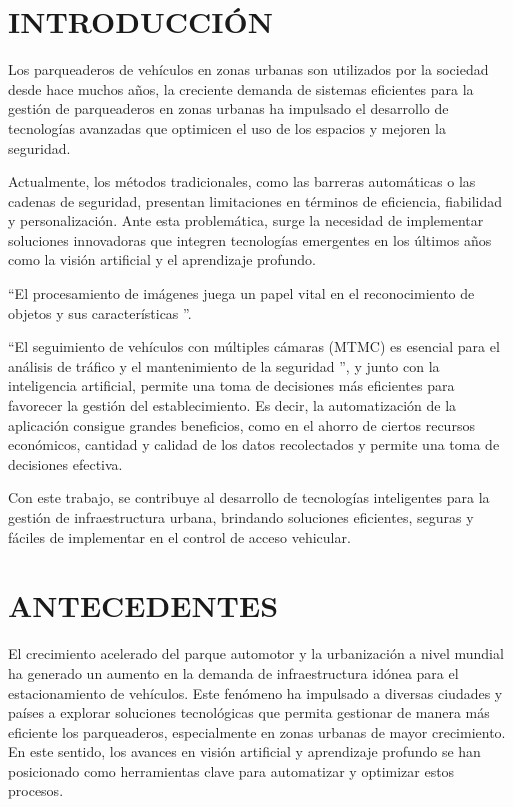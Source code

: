 \section*{INTRODUCCIÓN}

Los parqueaderos de vehículos en zonas urbanas son utilizados por la sociedad desde hace
muchos años, la creciente demanda de sistemas eficientes para la gestión de parqueaderos en
zonas urbanas ha impulsado el desarrollo de tecnologías avanzadas que optimicen el uso de los
espacios y mejoren la seguridad.

Actualmente, los métodos tradicionales, como las barreras automáticas o las cadenas de
seguridad, presentan limitaciones en términos de eficiencia, fiabilidad y personalización. Ante
esta problemática, surge la necesidad de implementar soluciones innovadoras que integren
tecnologías emergentes en los últimos años como la visión artificial y el aprendizaje profundo.

``El procesamiento de imágenes juega un papel vital en el reconocimiento de objetos y sus
características \cite{deshpande2020comparative}''.

``El seguimiento de vehículos con múltiples cámaras (MTMC) es esencial para el análisis
de tráfico y el mantenimiento de la seguridad \cite{tang2019cityflow}'', y junto con la
inteligencia artificial, permite una toma de decisiones más eficientes para favorecer
la gestión del establecimiento. Es decir, la automatización de la aplicación consigue
grandes beneficios, como en el ahorro de ciertos recursos económicos, cantidad y
calidad de los datos recolectados y permite una toma de decisiones efectiva.

Con este trabajo, se contribuye al desarrollo de tecnologías
inteligentes para la gestión de infraestructura urbana, brindando
soluciones eficientes, seguras y fáciles de implementar en el control de
acceso vehicular.

\section*{ANTECEDENTES}

El crecimiento acelerado del parque automotor y la urbanización a nivel
mundial ha generado un aumento en la demanda de infraestructura idónea
para el estacionamiento de vehículos. Este fenómeno ha impulsado a
diversas ciudades y países a explorar soluciones tecnológicas
\cite{liu2023camera} que
permita gestionar de manera más eficiente los parqueaderos,
especialmente en zonas urbanas de mayor crecimiento. En este sentido,
los avances en visión artificial y aprendizaje profundo se han
posicionado como herramientas clave para automatizar y optimizar estos
procesos.

